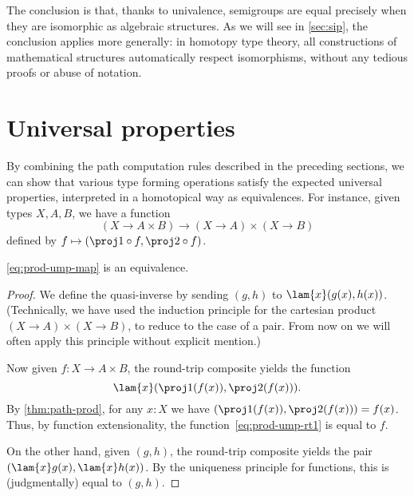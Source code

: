 The conclusion is that, thanks to univalence, semigroups are equal
precisely when they are isomorphic as algebraic structures. As we will see in \cref{sec:sip}, the
conclusion applies more generally: in homotopy type theory, all constructions of
mathematical structures automatically respect isomorphisms, without any
tedious proofs or abuse of notation.

\section{Universal properties}
\label{sec:universal-properties}

%
By combining the path computation rules described in the preceding sections, we can show that various type forming operations satisfy the expected universal properties, interpreted in a homotopical way as equivalences.
For instance, given types $X,A,B$, we have a function
%
\begin{equation}\label{eq:prod-ump-map}
  (X\to A\times B) \to (X\to A)\times (X\to B)
\end{equation}
defined by $f \mapsto (\proj1 \circ f, \proj2\circ f)$.

\begin{thm}\label{thm:prod-ump}
  \eqref{eq:prod-ump-map} is an equivalence.
\end{thm}
\begin{proof}
  We define the quasi-inverse by sending $(g,h)$ to $\lam{x}(g(x),h(x))$.
  (Technically, we have used the induction principle for the cartesian product $(X\to A)\times (X\to B)$, to reduce to the case of a pair.
  From now on we will often apply this principle without explicit mention.)

  Now given $f:X\to A\times B$, the round-trip composite yields the function
  \begin{equation}
    \lam{x} (\proj1(f(x)),\proj2(f(x))).\label{eq:prod-ump-rt1}
  \end{equation}
  By \cref{thm:path-prod}, for any $x:X$ we have $(\proj1(f(x)),\proj2(f(x))) = f(x)$.
  Thus, by function extensionality, the function~\eqref{eq:prod-ump-rt1} is equal to $f$.

  On the other hand, given $(g,h)$, the round-trip composite yields the pair $(\lam{x} g(x),\lam{x} h(x))$.
  By the uniqueness principle for functions, this is (judgmentally) equal to $(g,h)$.
\end{proof}

